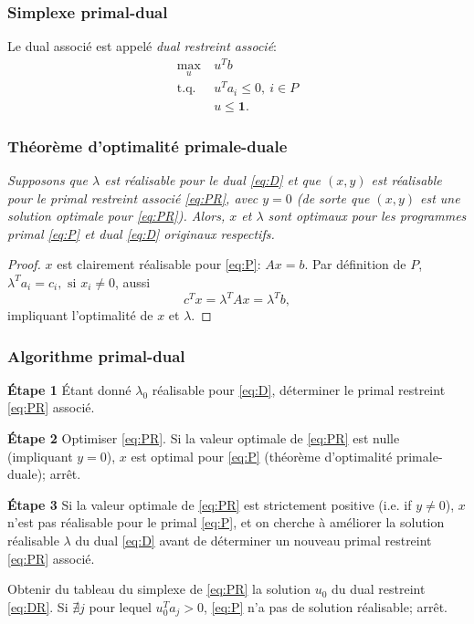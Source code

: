 \documentclass[t, aspectratio=169, usepdftitle=false]{beamer}
\def\bone{\boldsymbol{1}}
\begin{document}
\begin{frame}
\frametitle{Simplexe primal-dual}

Le dual associé est appelé {\sl dual restreint associé}:
\begin{equation}
	\tag{DR}
	\label{eq:DR}
\begin{aligned}
\max_u\ & u^T b\\
\mbox{t.q. } & u^T a_i \leq 0,\ i \in P\\
& u \leq \bone.
\end{aligned}
\end{equation}

\end{frame}

\begin{frame}
\frametitle{Théorème d'optimalité primale-duale}

{\sl Supposons que $\lambda$ est réalisable pour le dual \eqref{eq:D} et que $(x,y)$ est réalisable pour le primal restreint associé \eqref{eq:PR}, avec $y = 0$ (de sorte que $(x,y)$ est une solution optimale pour \eqref{eq:PR}). Alors, $x$ et $\lambda$ sont optimaux pour les programmes primal \eqref{eq:P} et dual \eqref{eq:D} originaux respectifs.}

\begin{proof}
$x$ est clairement réalisable pour \eqref{eq:P}: $Ax = b$.
Par définition de $P$, $\lambda^T a_i = c_i,\mbox{ si } x_i \ne 0$,
aussi
$$
c^T x = \lambda^T Ax = \lambda^T b,
$$
impliquant l'optimalité de $x$ et $\lambda$.
\end{proof}

\end{frame}

\begin{frame}
\frametitle{Algorithme primal-dual}

{\bf Étape 1}
Étant donné $\lambda_0$ réalisable pour \eqref{eq:D}, déterminer le primal restreint \eqref{eq:PR} associé.

\mbox{}

{\bf Étape 2}
Optimiser \eqref{eq:PR}.
Si la valeur optimale de \eqref{eq:PR} est nulle (impliquant $y = 0$), $x$ est optimal pour \eqref{eq:P} (théorème d'optimalité primale-duale); arrêt.


\mbox{}

{\bf Étape 3}
Si la valeur optimale de \eqref{eq:PR} est strictement positive
(i.e. if $y \ne 0$), $x$ n'est pas réalisable pour le primal \eqref{eq:P}, et on cherche à améliorer la solution réalisable $\lambda$ du dual \eqref{eq:D} avant de déterminer un nouveau primal restreint \eqref{eq:PR} associé.

Obtenir du tableau du simplexe de  \eqref{eq:PR} la solution $u_0$ du dual restreint  \eqref{eq:DR}.
Si $\nexists j$ pour lequel $u_0^T a_j > 0$, \eqref{eq:P} n'a pas de solution réalisable; arrêt.
\end{frame}
\end{document}
